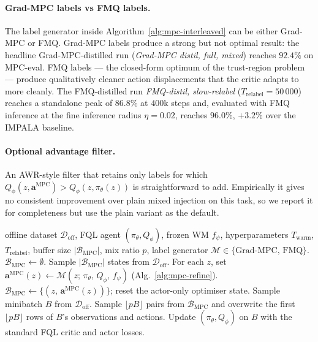 \paragraph{Grad-MPC labels vs FMQ labels.}
The label generator inside Algorithm~\ref{alg:mpc-interleaved} can be
either Grad-MPC or FMQ. Grad-MPC labels produce a strong but not
optimal result: the headline Grad-MPC-distilled run (\emph{Grad-MPC
distil, full, mixed}) reaches $92.4\%$ on MPC-eval. FMQ labels --- the
closed-form optimum of the trust-region problem --- produce
qualitatively cleaner action displacements that the critic adapts to
more cleanly. The FMQ-distilled run \emph{FMQ-distil, slow-relabel}
($T_{\text{relabel}} = 50\,000$) reaches a standalone peak of $86.8\%$
at $400$k steps and, evaluated with FMQ inference at the fine inference
radius $\eta = 0.02$, reaches \textbf{$96.0\%$}, $+3.2\%$ over the
IMPALA baseline.

\paragraph{Optional advantage filter.}
An AWR-style filter that retains only labels for which
$Q_\phi(z, \mathbf{a}^{\text{MPC}}) > Q_\phi(z, \pi_\theta(z))$ is
straightforward to add. Empirically it gives no consistent improvement
over plain mixed injection on this task, so we report it for
completeness but use the plain variant as the default.

\begin{algorithm}[t]
\caption{Interleaved MPC distillation.}
\label{alg:mpc-interleaved}
\begin{algorithmic}[1]
\Require offline dataset $\mathcal{D}_{\text{off}}$, FQL agent $(\pi_\theta, Q_\phi)$, frozen WM $f_\psi$, hyperparameters $T_{\text{warm}}$, $T_{\text{relabel}}$, buffer size $|\mathcal{B}_{\text{MPC}}|$, mix ratio $p$, label generator $\mathcal{M} \in \{\text{Grad-MPC},\, \text{FMQ}\}$.
\State $\mathcal{B}_{\text{MPC}} \leftarrow \emptyset$.
        \State Sample $|\mathcal{B}_{\text{MPC}}|$ states from $\mathcal{D}_{\text{off}}$.
        \State For each $z$, set $\mathbf{a}^{\text{MPC}}(z) \leftarrow \mathcal{M}(z;\,\pi_\theta,\,Q_\phi,\,f_\psi)$ (Alg.~\ref{alg:mpc-refine}).
        \State $\mathcal{B}_{\text{MPC}} \leftarrow \{(z,\,\mathbf{a}^{\text{MPC}}(z))\}$; reset the actor-only optimiser state.
    \EndIf
    \State Sample minibatch $B$ from $\mathcal{D}_{\text{off}}$.
        \State Sample $\lfloor pB \rfloor$ pairs from $\mathcal{B}_{\text{MPC}}$ and overwrite the first $\lfloor pB \rfloor$ rows of $B$'s observations and actions.
    \EndIf
    \State Update $(\pi_\theta, Q_\phi)$ on $B$ with the standard FQL critic and actor losses.
\EndFor
\end{algorithmic}
\end{algorithm}

